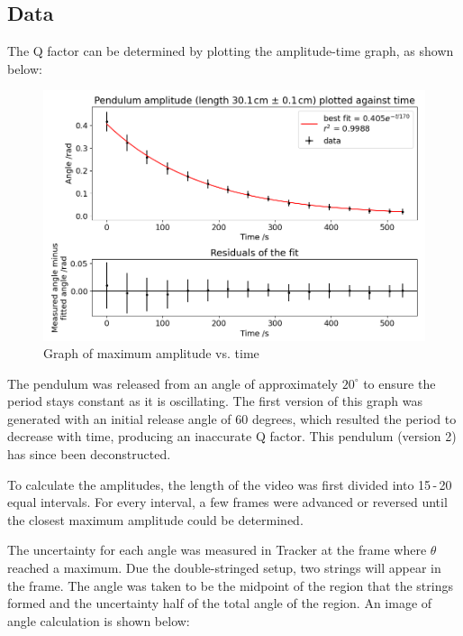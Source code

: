 \documentclass[11pt]{article}
\begin{document}
\begin{multicols}{2}
\subsection{Data}
{\color{blue}
The Q factor can be determined by plotting the amplitude-time graph, as shown below:
}

\begin{figure}[H]
    \centering
    \includegraphics[width=\linewidth]{../figures/max_amplitude_vs_time.png}
    \caption{\centering Graph of maximum amplitude vs. time}
    \label{fig:figure 4}
\end{figure}

{\color{blue}
The pendulum was released from an angle of approximately $20^\circ$ to ensure the period stays constant as it is oscillating. The first version of this graph was generated with an initial release angle of 60 degrees, which resulted the period to decrease with time, producing an inaccurate Q factor. This pendulum (version 2) has since been deconstructed.

To calculate the amplitudes, the length of the video was first divided into 15\,-\,20 equal intervals. For every interval, a few frames were advanced or reversed until the closest maximum amplitude could be determined.


The uncertainty for each angle was measured in Tracker \cite{tracker} at the frame where $\theta$ reached a maximum. Due the double-stringed setup, two strings will appear in the frame. The angle was taken to be the midpoint of the region that the strings formed and the uncertainty half of the total angle of the region. An image of angle calculation is shown below:}



\end{multicols}
\end{document}

